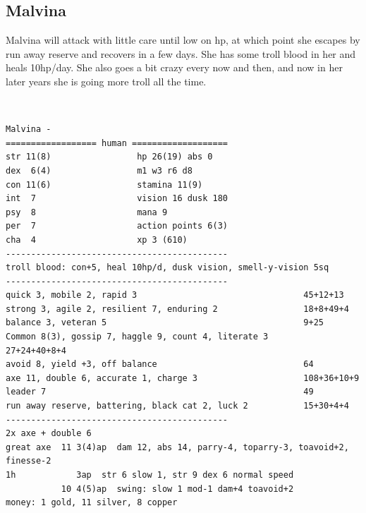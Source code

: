 \goodbreak
\begin{samepage}
\subsection*{Malvina}
Malvina will attack with little care until low on hp, at which point she escapes by run away reserve and recovers in a few days. She has some troll blood in her and heals 10hp/day. She also goes a bit crazy every now and then, and now in her later years she is going more troll all the time.

\

\small \begin{verbatim}
Malvina -
================== human ===================
str 11(8)                 hp 26(19) abs 0
dex  6(4)                 m1 w3 r6 d8
con 11(6)                 stamina 11(9)
int  7                    vision 16 dusk 180
psy  8                    mana 9
per  7                    action points 6(3)
cha  4                    xp 3 (610)
--------------------------------------------
troll blood: con+5, heal 10hp/d, dusk vision, smell-y-vision 5sq
--------------------------------------------
quick 3, mobile 2, rapid 3                                 45+12+13
strong 3, agile 2, resilient 7, enduring 2                 18+8+49+4
balance 3, veteran 5                                       9+25
Common 8(3), gossip 7, haggle 9, count 4, literate 3       27+24+40+8+4
avoid 8, yield +3, off balance                             64
axe 11, double 6, accurate 1, charge 3                     108+36+10+9
leader 7                                                   49
run away reserve, battering, black cat 2, luck 2           15+30+4+4
--------------------------------------------
2x axe + double 6
great axe  11 3(4)ap  dam 12, abs 14, parry-4, toparry-3, toavoid+2, finesse-2
1h            3ap  str 6 slow 1, str 9 dex 6 normal speed
           10 4(5)ap  swing: slow 1 mod-1 dam+4 toavoid+2
money: 1 gold, 11 silver, 8 copper
\end{verbatim} \normalsize
\end{samepage}

\





